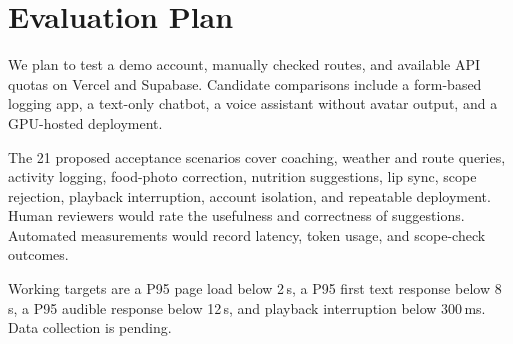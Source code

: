 \section{Evaluation Plan}\label{sec:experiments}
We plan to test a demo account, manually checked routes, and available API quotas on Vercel and Supabase. Candidate comparisons include a form-based logging app, a text-only chatbot, a voice assistant without avatar output, and a GPU-hosted deployment.

The 21 proposed acceptance scenarios cover coaching, weather and route queries, activity logging, food-photo correction, nutrition suggestions, lip sync, scope rejection, playback interruption, account isolation, and repeatable deployment. Human reviewers would rate the usefulness and correctness of suggestions. Automated measurements would record latency, token usage, and scope-check outcomes.

Working targets are a P95 page load below 2\,s, a P95 first text response below 8\,s, a P95 audible response below 12\,s, and playback interruption below 300\,ms. Data collection is pending.

